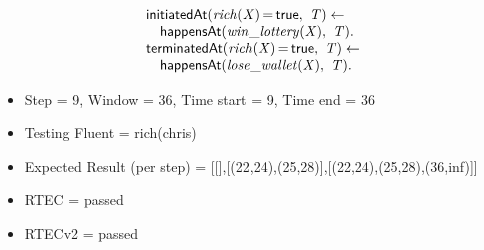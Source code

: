 \documentclass[8pt]{beamer}
\DeclareMathOperator{\val}{=}  %
\def \patsize {}
\def\happensAt{\textsf{\patsize happensAt}}
\def\initiatedAt{\textsf{\patsize initiatedAt}}
\def\terminatedAt{\textsf{\patsize terminatedAt}}
\def\true{\textsf{\patsize true}}
\newenvironment{mysplit}%
  {\arraycolsep 0pt \begin{array}{l}}%
  {\end{array}}
\begin{document}
\begin{frame}
\begin{minipage}{0.48\linewidth}
        \begin{align*}
            \begin{mysplit}
                \initiatedAt\mathit{(rich(X)\val\true,\ T) \leftarrow}\\
                \quad    \happensAt\mathit{(win\_lottery(X),\ T).}\\
                \terminatedAt\mathit{(rich(X)\val\true,\ T) \leftarrow}\\
                \quad    \happensAt\mathit{(lose\_wallet(X),\ T)}.\\
            \end{mysplit}
        \end{align*}
    \end{minipage}
    \begin{itemize}
        \item Step = 9, Window = 36, Time start = 9, Time end = 36
        \item Testing Fluent = rich(chris)
        \item Expected Result (per step) = [[],[(22,24),(25,28)],[(22,24),(25,28),(36,inf)]]
        \item RTEC = passed
        \item RTECv2 = passed
    \end{itemize}
\end{frame}
\end{document}
